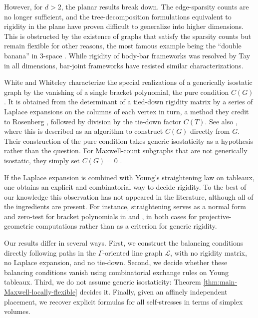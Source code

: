 \documentclass[11pt,letterpaper]{amsart}
\theoremstyle{definition}
\begin{document}
However, for $d > 2$, the planar results break down.  The
edge-sparsity counts are no longer sufficient, and the tree-decomposition
formulations equivalent to rigidity in the plane
\cite{crapo, lovasz-yemini} have proven difficult to generalize into higher dimensions.
This is obstructed by the existence of graphs that satisfy the sparsity counts but remain flexible for other reasons, the most famous example being the ``double banana'' in 3-space \cite{hyperbananas, rigidity-textbook}. While rigidity of body-bar frameworks was resolved by Tay \cite{tay} in all dimensions, bar-joint frameworks have resisted similar characterizations. 

White and Whiteley \cite{white-whiteley} characterize the special realizations of a generically isostatic graph by the vanishing of a single bracket polynomial, the pure condition $C(G)$. It is obtained from the determinant of a tied-down rigidity matrix by a series of Laplace expansions on the columns of each vertex in turn, a method they credit to Rosenberg \cite{rosenberg-crm}, followed by division by the tie-down factor $C(T)$. See also \cite[\S 60.4.2]{white-handbook}, where this is described as an algorithm to construct $C(G)$ directly from $G$. 
Their construction of the pure condition takes generic isostaticity as a hypothesis rather than the question. For Maxwell-count subgraphs that are not generically isostatic, they simply set $C(G) = 0$ \cite[\S5]{white-whiteley}.

If the Laplace expansion is combined with Young's straightening law on tableaux, one obtains an explicit and combinatorial way to decide rigidity. To the best of our knowledge this observation has not appeared in the literature, although all of the ingredients are present. For instance, straightening serves as a normal form and zero-test for bracket polynomials in \cite[\S 60.3]{white-handbook} and \cite{sturmfels-whiteley}, in both cases for projective-geometric computations rather than as a criterion for generic rigidity.

Our results differ in several ways. 
First, we construct the balancing conditions directly following paths in the $\Gamma$-oriented line graph $\mathcal{L}$, with no rigidity matrix, no Laplace expansion, and no tie-down. 
Second, we decide whether these balancing conditions vanish using combinatorial exchange rules on Young tableaux.  
Third, we do not assume generic isostaticity: Theorem \ref{thm:main-Maxwell-locally-flexible} decides it. Finally, given an affinely independent placement, we recover explicit formulas for all self-stresses in terms of simplex volumes.
\end{document}
